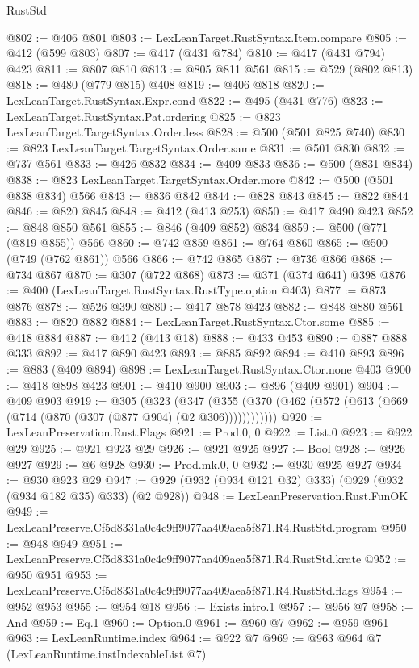 \begin{lexlean}{RustStd}
\begin{coremodule}
@802 := @406 @801
@803 := LexLeanTarget.RustSyntax.Item.compare
@805 := @412 (@599 @803)
@807 := @417 (@431 @784)
@810 := @417 (@431 @794) @423
@811 := @807 @810
@813 := @805 @811 @561
@815 := @529 (@802 @813)
@818 := @480 (@779 @815) @408
@819 := @406 @818
@820 := LexLeanTarget.RustSyntax.Expr.cond
@822 := @495 (@431 @776)
@823 := LexLeanTarget.RustSyntax.Pat.ordering
@825 := @823 LexLeanTarget.TargetSyntax.Order.less
@828 := @500 (@501 @825 @740)
@830 := @823 LexLeanTarget.TargetSyntax.Order.same
@831 := @501 @830
@832 := @737 @561
@833 := @426 @832
@834 := @409 @833
@836 := @500 (@831 @834)
@838 := @823 LexLeanTarget.TargetSyntax.Order.more
@842 := @500 (@501 @838 @834) @566
@843 := @836 @842
@844 := @828 @843
@845 := @822 @844
@846 := @820 @845
@848 := @412 (@413 @253)
@850 := @417 @490 @423
@852 := @848 @850 @561
@855 := @846 (@409 @852) @834
@859 := @500 (@771 (@819 @855)) @566
@860 := @742 @859
@861 := @764 @860
@865 := @500 (@749 (@762 @861)) @566
@866 := @742 @865
@867 := @736 @866
@868 := @734 @867
@870 := @307 (@722 @868)
@873 := @371 (@374 @641) @398
@876 := @400 (LexLeanTarget.RustSyntax.RustType.option @403)
@877 := @873 @876
@878 := @526 @390
@880 := @417 @878 @423
@882 := @848 @880 @561
@883 := @820 @882
@884 := LexLeanTarget.RustSyntax.Ctor.some
@885 := @418 @884
@887 := @412 (@413 @18)
@888 := @433 @453
@890 := @887 @888 @333
@892 := @417 @890 @423
@893 := @885 @892
@894 := @410 @893
@896 := @883 (@409 @894)
@898 := LexLeanTarget.RustSyntax.Ctor.none @403
@900 := @418 @898 @423
@901 := @410 @900
@903 := @896 (@409 @901)
@904 := @409 @903
@919 := @305
    (@323
      (@347 (@355 (@370 (@462 (@572 (@613 (@669 (@714 (@870 (@307 (@877 @904) (@2 @306))))))))))))
@920 := LexLeanPreservation.Rust.Flags
@921 := Prod.{0, 0}
@922 := List.{0}
@923 := @922 @29
@925 := @921 @923 @29
@926 := @921 @925
@927 := Bool
@928 := @926 @927
@929 := @6 @928
@930 := Prod.mk.{0, 0}
@932 := @930 @925 @927
@934 := @930 @923 @29
@947 := @929 (@932 (@934 @121 @32) @333) (@929 (@932 (@934 @182 @35) @333) (@2 @928))
@948 := LexLeanPreservation.Rust.FunOK
@949 := LexLeanPreserve.Cf5d8331a0c4c9ff9077aa409aea5f871.R4.RustStd.program
@950 := @948 @949
@951 := LexLeanPreserve.Cf5d8331a0c4c9ff9077aa409aea5f871.R4.RustStd.krate
@952 := @950 @951
@953 := LexLeanPreserve.Cf5d8331a0c4c9ff9077aa409aea5f871.R4.RustStd.flags
@954 := @952 @953
@955 := @954 @18
@956 := Exists.intro.{1}
@957 := @956 @7
@958 := And
@959 := Eq.{1}
@960 := Option.{0}
@961 := @960 @7
@962 := @959 @961
@963 := LexLeanRuntime.index
@964 := @922 @7
@969 := @963 @964 @7 (LexLeanRuntime.instIndexableList @7)

\end{coremodule}
\end{lexlean}
